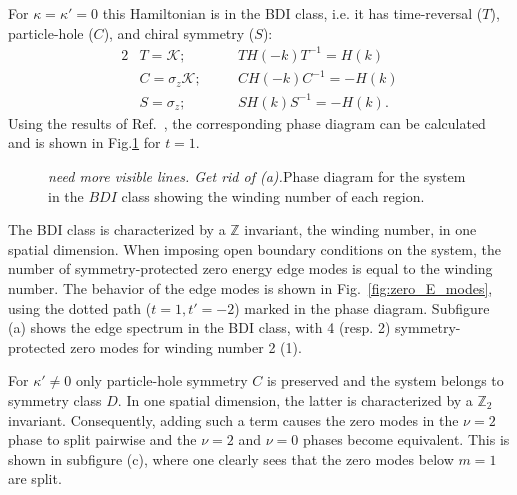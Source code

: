 \documentclass[twocolumn,amsmath,longbibliography,amssymb,superscriptaddress]{revtex4-1}
\newcommand{\mariac}[1]{{\it\color{cyan}#1}}
\begin{document}
For $\kappa = \kappa' = 0$ this Hamiltonian is in the BDI class, i.e. it has time-reversal ($T$), particle-hole ($C$), and chiral symmetry ($S$):
\begin{alignat}{2}
&T = \mathcal{K} ; \quad &&T H(-k) T^{-1} = H(k) \nonumber\\
&C = \sigma_z\mathcal{K} ; \quad &&C H(-k) C^{-1} = -H(k) \nonumber\\
&S = \sigma_z ; \quad &&S H(k)S^{-1} = -H(k) .
\end{alignat}
Using the results of Ref.~\cite{Song2014}, the corresponding phase diagram can be calculated and is shown in Fig.\ref{fig:bdi_phase_diagram} for $t=1$. 
\begin{figure}[t]
	\centering
	\hspace{0mm}
\caption{\mariac{need more visible lines. Get rid of (a).}Phase diagram for the system in the $BDI$ class showing the winding number of each region.}
\label{fig:bdi_phase_diagram}
\end{figure}
The BDI class  is characterized by a $\mathbb{Z}$ invariant, the winding number,  in one spatial dimension.
When imposing open boundary conditions on the system, the number of symmetry-protected zero energy edge modes is equal to the winding number. 
The behavior of the  edge modes  is  shown in Fig.~\ref{fig:zero_E_modes}, using the dotted path ($t=1,t'=-2$) marked in the phase diagram. 
Subfigure (a) shows the edge spectrum in the BDI class, with 4 (resp. 2) symmetry-protected zero modes for winding number 2 (1). 

For $\kappa' \neq 0$ only particle-hole symmetry $C$ is preserved and the system belongs to symmetry class $D$. 
In one spatial dimension, the latter is characterized by a $\mathbb{Z}_2$ invariant.  
Consequently, adding such a term causes the zero modes in the $\nu=2$ phase to split  pairwise and the $\nu = 2$ and $\nu=0$ phases become equivalent. 
This is shown in subfigure (c), where one clearly sees that the zero modes below $m=1$ are split. 
\end{document}
